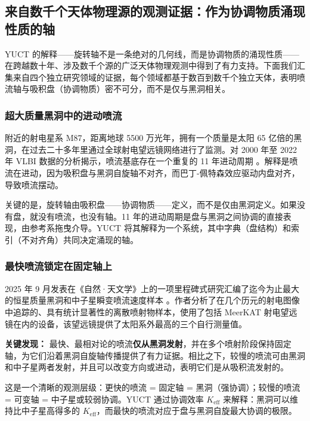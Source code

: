 \documentclass[12pt,a4paper]{article}
\begin{document}
	\subsection{来自数千个天体物理源的观测证据：作为协调物质涌现性质的轴}
	
	YUCT 的解释——旋转轴不是一条绝对的几何线，而是协调物质的涌现性质——在跨越数十年、涉及数千个源的广泛天体物理观测中得到了有力支持。下面我们汇集来自四个独立研究领域的证据，每个领域都基于数百到数千个独立天体，表明喷流轴与吸积盘（协调物质）密不可分，而不是仅与黑洞相关。
	
	\subsubsection{超大质量黑洞中的进动喷流}
	
	附近的射电星系 M87，距离地球 5500 万光年，拥有一个质量是太阳 65 亿倍的黑洞，在过去二十多年里通过全球射电望远镜网络进行了监测。对 2000 年至 2022 年 VLBI 数据的分析揭示，喷流基底存在一个重复的 11 年进动周期 \cite{M87Precession2024}。解释是喷流在进动，因为吸积盘与黑洞自旋轴不对齐，而巴丁-佩特森效应驱动内盘对齐，导致喷流摆动。
	
	关键的是，旋转轴由吸积盘——协调物质——定义，而不是仅由黑洞定义。如果没有盘，就没有喷流，也没有轴。11 年的进动周期是盘与黑洞之间协调的直接表现，由参考系拖曳介导。YUCT 将其解释为一个系统，其中字典（盘结构）和索引（不对齐角）共同决定涌现的轴。
	
	\subsubsection{最快喷流锁定在固定轴上}
	
	2025 年 9 月发表在《自然·天文学》上的一项里程碑式研究汇编了迄今为止最大的恒星质量黑洞和中子星瞬变喷流速度样本 \cite{NatureAstronomy2025}。作者分析了在几个历元的射电图像中追踪的、具有统计显著性的离散喷射物样本，使用了包括 MeerKAT 射电望远镜在内的设备，该望远镜提供了太阳系外最高的三个自行测量值。
	
	\textbf{关键发现：} 最快、最相对论的喷流\textbf{仅从黑洞发射}，并在多个喷射阶段保持固定轴，为它们沿着黑洞自旋轴传播提供了有力证据。相比之下，较慢的喷流可由黑洞和中子星两者发射，并且可以改变方向或进动，表明它们是从吸积流发射的。
	
	这是一个清晰的观测层级：更快的喷流 = 固定轴 = 黑洞（强协调）；较慢的喷流 = 可变轴 = 中子星或较弱协调。YUCT 通过协调效率 \(K_{\mathrm{eff}}\) 来解释：黑洞可以维持比中子星高得多的 \(K_{\mathrm{eff}}\)，而最快的喷流对应于盘与黑洞自旋最大协调的极限。
	
\end{document}
